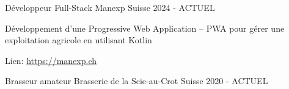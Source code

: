 

\begin{cventries}

    \cventry
    {Développeur Full-Stack} %
    {Manexp} %
    {Suisse} %
    {2024 - ACTUEL} %
    {
      \begin{cvitems} %
        \item {Développement d'une Progressive Web Application -- PWA pour gérer une exploitation agricole en utilisant Kotlin}
        \item {Lien: \href{https://manexp.ch}{https://manexp.ch}}
      \end{cvitems}
    }

    \cventry
    {Brasseur amateur} %
    {Brasserie de la Scie-au-Crot} %
    {Suisse} %
    {2020 - ACTUEL} %
    {}

\end{cventries}
